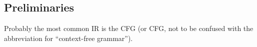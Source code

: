 \subsection{Preliminaries}\label{sec:intro:prelim}

Probably the most common \acrlong{IR} is the \acrlong{CFG} (or \acrshort{CFG},
not to be confused with the abbreviation for ``context-free grammar'').  

%
%
